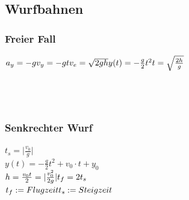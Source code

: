	\subsection{Wurfbahnen}
	
	\begin{multicols}{3}
		\subsubsection{Freier Fall}
		$a_{y} = -g \\
		v_{y} = -gt \\
		v_{e} = \sqrt{2gh} \\
		y(t) = -\frac{g}{2}t^2 \\
		t = \sqrt{\frac{2h}{g}}$ \\
		\\
		\\
		\\
	
		\columnbreak
		\subsubsection{Senkrechter Wurf}
		$t_{s} = \lvert{\frac{v_{0}}{g}}\rvert$ \\
		$y(t) = -\frac{g}{2}t^2 + v_0 \cdot t + y_0 $\\
		$h = \frac{v_{0}t}{2} = \lvert{\frac{v_{0}^2}{2g}}\rvert \\
		t_{f} = 2t_{s}$ \\
		$t_{f}:= Flugzeit \\
		t_{s}:= Steigzeit$ \\
		\\
	
		\columnbreak

\end{multicols}
